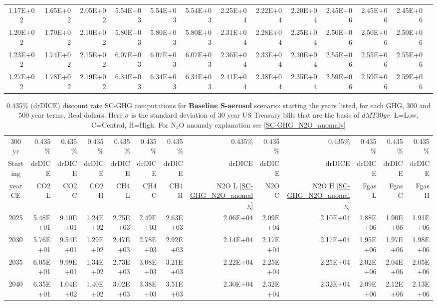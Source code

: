 \documentclass{article}
\begin{document}
\begin{table}
\begin{tabular}{crrr|rrr|rrr|rrr}
1.17E+02 & 1.65E+02 & 2.05E+02 & 5.54E+03 & 5.54E+03 & 5.54E+03 & 2.25E+04 & 2.22E+04 & 2.20E+04 & 2.45E+06 & 2.45E+06 & 2.45E+06 \\
1.20E+02 & 1.70E+02 & 2.10E+02 & 5.80E+03 & 5.80E+03 & 5.80E+03 & 2.31E+04 & 2.28E+04 & 2.25E+04 & 2.50E+06 & 2.50E+06 & 2.50E+06 \\
1.23E+02 & 1.74E+02 & 2.15E+02 & 6.07E+03 & 6.07E+03 & 6.07E+03 & 2.36E+04 & 2.33E+04 & 2.30E+04 & 2.55E+06 & 2.55E+06 & 2.55E+06 \\
1.27E+02 & 1.78E+02 & 2.19E+02 & 6.34E+03 & 6.34E+03 & 6.34E+03 & 2.41E+04 & 2.38E+04 & 2.35E+04 & 2.59E+06 & 2.59E+06 & 2.59E+06
\end{tabular} 
\end{table}

\begin{table}
     \caption{0.435\% (drDICE) discount rate  SC-GHG computations for \textbf{Baseline S-aerosol} scenario: starting the years listed, for each GHG, 300 and 500 year terms. Real dollars. Here $\sigma$ is the standard deviation of 30 year US Treasury bills that are the basis of $dMT30yr$. L=Low, C=Central, H=High. For N$_2$O anomaly explanation see \ref{SC-GHG_N2O_anomaly}} 
\label{PVs_300_yearSCC_BH0.435}
\small
\begin{tabular}{crrr|rrr|rrr|rrr}
300 yr   & 0.435\%  & 0.435\%  & 0.435\%  & 0.435\%  & 0.435\%  & 0.435\%  & 0.435\%  & 0.435\%  & 0.435\%  & 0.435\%  & 0.435\%  & 0.435\%  \\
Starting & drDICE   & drDICE   & drDICE   & drDICE   & drDICE   & drDICE   & drDICE   & drDICE   & drDICE   & drDICE   & drDICE   & drDICE   \\
year CE  & CO2 L    & CO2 C    & CO2 H    & CH4 L    & CH4 C    & CH4 H    & N2O L \ref{SC-GHG_N2O_anomaly}     & N2O C      & N2O H \ref{SC-GHG_N2O_anomaly}    & Fgas L   & Fgas C   & Fgas H   \\
2025     & 5.48E+01 & 9.10E+01 & 1.24E+02 & 2.25E+03 & 2.49E+03 & 2.63E+03 & 2.06E+04 & 2.09E+04 & 2.10E+04 & 1.88E+06 & 1.90E+06 & 1.91E+06 \\
2030     & 5.76E+01 & 9.54E+01 & 1.29E+02 & 2.47E+03 & 2.78E+03 & 2.92E+03 & 2.14E+04 & 2.17E+04 & 2.17E+04 & 1.95E+06 & 1.97E+06 & 1.98E+06 \\
2035     & 6.05E+01 & 9.99E+01 & 1.34E+02 & 2.73E+03 & 3.08E+03 & 3.21E+03 & 2.22E+04 & 2.25E+04 & 2.25E+04 & 2.02E+06 & 2.04E+06 & 2.05E+06 \\
2040     & 6.35E+01 & 1.04E+02 & 1.40E+02 & 3.02E+03 & 3.38E+03 & 3.51E+03 & 2.30E+04 & 2.32E+04 & 2.32E+04 & 2.09E+06 & 2.12E+06 & 2.13E+06 \\

\end{tabular}
\end{table}
\end{document}
